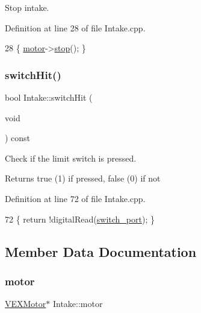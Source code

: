 Stop intake. 



Definition at line 28 of file Intake.\+cpp.


\begin{DoxyCode}
28 \{ \hyperlink{class_intake_abfffad571bacf945d6a2a121f59869fd}{motor}->\hyperlink{class_v_e_x_motor_aed9dadedda6a075093f076921958e7ed}{stop}(); \}
\end{DoxyCode}
\mbox{\label{class_intake_ae9bf8ae8ebed0f1ba36443373eb0ae63}} 
\subsubsection{\texorpdfstring{switch\+Hit()}{switchHit()}}
{\footnotesize\ttfamily bool Intake\+::switch\+Hit (\begin{DoxyParamCaption}\item[{void}]{ }\end{DoxyParamCaption}) const}



Check if the limit switch is pressed. 

\begin{DoxyReturn}{Returns}
true (1) if pressed, false (0) if not 
\end{DoxyReturn}


Definition at line 72 of file Intake.\+cpp.


\begin{DoxyCode}
72 \{ \textcolor{keywordflow}{return} !digitalRead(\hyperlink{class_intake_aa42c4826bb88549c29ff88a355765787}{switch\_port}); \}
\end{DoxyCode}


\subsection{Member Data Documentation}
\mbox{\label{class_intake_abfffad571bacf945d6a2a121f59869fd}} 
\subsubsection{\texorpdfstring{motor}{motor}}
{\footnotesize\ttfamily \hyperlink{class_v_e_x_motor}{V\+E\+X\+Motor}$\ast$ Intake\+::motor\hspace{0.3cm}{\ttfamily [private]}}



